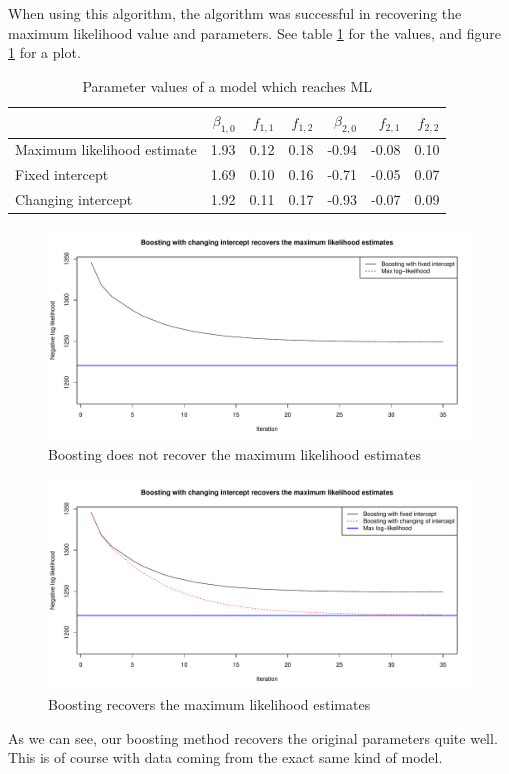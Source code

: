 When using this algorithm, the algorithm was successful in recovering the maximum likelihood value and parameters.
See table \ref{table:ML} for the values, and figure \ref{fig:boosting-ML-fixed-only} for a plot.
\begin{table}\caption{Parameter values of a model which reaches ML}\label{table:ML}
\begin{tabular}{l|rrrrrr}
    & $\beta_{1,0}$ & $f_{1,1}$ & $f_{1,2}$ & $\beta_{2,0}$ & $f_{2,1}$ & $f_{2,2}$ \\
\hline
Maximum likelihood estimate     &    1.93 &    0.12 &    0.18 &    -0.94 &    -0.08 &     0.10 \\
Fixed intercept &    1.69 &    0.10 &    0.16 &    -0.71 &    -0.05 &     0.07 \\
Changing intercept    &    1.92 &    0.11 &    0.17 &    -0.93 &    -0.07 &     0.09
\end{tabular}\end{table}

\begin{figure}\label{fig:boosting-ML-fixed-only}
\caption{Boosting does not recover the maximum likelihood estimates}
\centering\includegraphics[scale=0.4]{figures/case1_fixed_only.pdf}
\end{figure}

\begin{figure}\label{fig:boosting-ML}
\caption{Boosting recovers the maximum likelihood estimates}
\centering\includegraphics[scale=0.4]{figures/small_example.pdf}
\end{figure}

As we can see, our boosting method recovers the original parameters quite well. This is of course with data coming from the exact same kind of model.